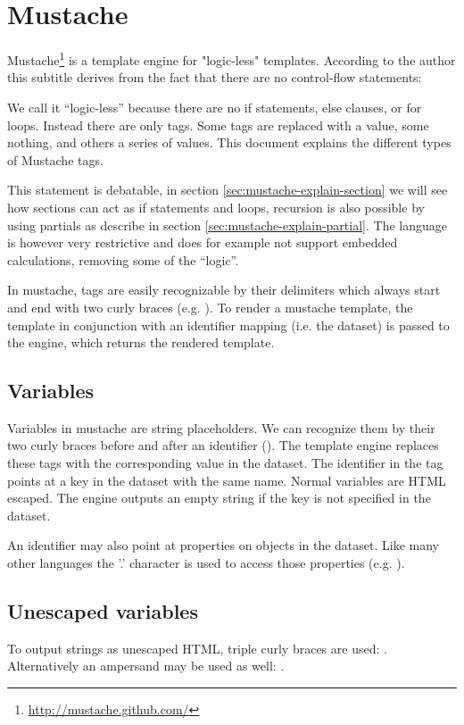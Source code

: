 \documentclass[thesis.tex]{subfiles}
\begin{document}
\chapter{Mustache}
\label{chap:mustache}
Mustache\footnote{\url{http://mustache.github.com/}} is a template engine for
"logic-less" templates.
According to the author this subtitle derives from the fact that there are no
control-flow statements:
\begin{citequote}{\cite{MUSTACHE5}}
We call it ``logic-less'' because there are no if statements, else clauses, or for
loops. Instead there are only tags. Some tags are replaced with a value, some
nothing, and others a series of values. This document explains the different
types of Mustache tags.
\end{citequote}
This statement is debatable, in section \ref{sec:mustache-explain-section} we
will see how sections can act as if statements and loops, recursion is
also possible by using partials as describe in
section \ref{sec:mustache-explain-partial}.
The language is however very restrictive and does for example not support
embedded calculations, removing some of the ``logic''. 

In mustache, tags are easily recognizable by their delimiters which always start
and end with two curly braces (e.g. ).
To render a mustache template, the template in conjunction with an
identifier mapping (i.e. the dataset) is passed to the engine, which returns the
rendered template.

\section{Variables}
\label{sect:mustache-vars}
Variables in mustache are string placeholders. We can recognize them by their
two curly braces before and after an identifier ().
The template engine replaces these tags with the corresponding value in the
dataset.
The identifier in the tag points at a key in the dataset with the same name.
Normal variables are HTML escaped. The engine outputs an empty string if the
key is not specified in the dataset.

An identifier may also point at properties on objects in the dataset. Like many
other languages the '.' character is used to access those properties (e.g.
).

\section{Unescaped variables}
To output strings as unescaped HTML, triple curly braces are used:
. Alternatively an ampersand may be used as well:
.
\end{document}
